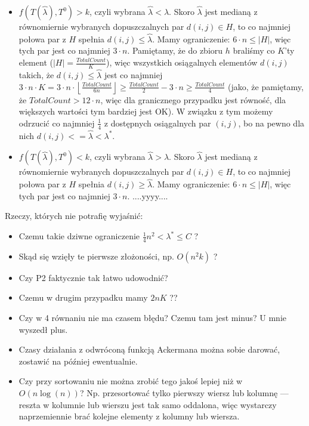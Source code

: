 \begin{itemize}
	
	\begin{itemize}
		\item $f \left( T \left( \overbrace{\lambda} \right), T^{0} \right) > k$, czyli wybrana $\overbrace{\lambda} < \lambda$. Skoro $\overbrace{\lambda}$ jest medianą z równomiernie wybranych dopuszczalnych par $d \left( i, j \right) \in H$, to co najmniej połowa par z $H$ spełnia $d \left( i, j \right) \leqslant \overbrace{\lambda}$. Mamy ograniczenie: $6 \cdot n \leqslant \left| H \right|$, więc tych par jest co najmniej $3 \cdot n$. Pamiętamy, że do zbioru $h$ braliśmy co $K$'ty element ($\left| H \right| = \frac{TotalCount}{K}$), więc wszystkich osiągalnych elementów $d \left( i, j \right)$ takich, że $d \left( i, j \right) \leqslant \overbrace{\lambda}$ jest co najmniej $3 \cdot n \cdot K = 3 \cdot n \cdot \left \lfloor \frac{TotalCount}{6n} \right \rfloor \geqslant \frac{TotalCount}{2} - 3 \cdot n \geqslant \frac{TotalCount}{4}$ (jako, że pamiętamy, że $TotalCount > 12 \cdot n$, więc dla granicznego przypadku jest równość, dla większych wartości tym bardziej jest OK). W związku z tym możemy odrzucić co najmniej $\frac{1}{4}$ z dostępnych osiągalnych par $\left( i, j \right)$, bo na pewno dla nich $d \left( i, j \right) <= \overbrace{\lambda} < \lambda^{\ast}$.
		\item $f \left( T \left( \overbrace{\lambda} \right), T^{0} \right) < k$, czyli wybrana $\overbrace{\lambda} > \lambda$. Skoro $\overbrace{\lambda}$ jest medianą z równomiernie wybranych dopuszczalnych par $d \left( i, j \right) \in H$, to co najmniej połowa par z $H$ spełnia $d \left( i, j \right) \geqslant \overbrace{\lambda}$. Mamy ograniczenie: $6 \cdot n \leqslant \left| H \right|$, więc tych par jest co najmniej $3 \cdot n$. ....yyyy....
	\end{itemize} 
	
	Rzeczy, których nie potrafię wyjaśnić:
	
	\begin{itemize}
		\item Czemu takie dziwne ograniczenie $\frac{1}{4} n^{2} < \lambda^{\ast} \leqslant C$ ?
		\item Skąd się wzięły te pierwsze złożoności, np. $O \left( n^2 k \right)$ ?
		\item Czy P2 faktycznie tak łatwo udowodnić?
		\item Czemu w drugim przypadku mamy $2nK$ ??
		\item Czy w 4 równaniu nie ma czasem błędu? Czemu tam jest minus? U mnie wyszedł plus.
		\item Czasy działania z odwróconą funkcją Ackermana można sobie darować, zostawić na później ewentualnie.
		\item Czy przy sortowaniu nie można zrobić tego jakoś lepiej niż w $O \left( n \log \left( n \right) \right)$? Np. przesortować tylko pierwszy wiersz lub kolumnę --- reszta w kolumnie lub wierszu jest tak samo oddalona, więc wystarczy naprzemiennie brać kolejne elementy z kolumny lub wiersza.
	\end{itemize}
	

\end{itemize}
